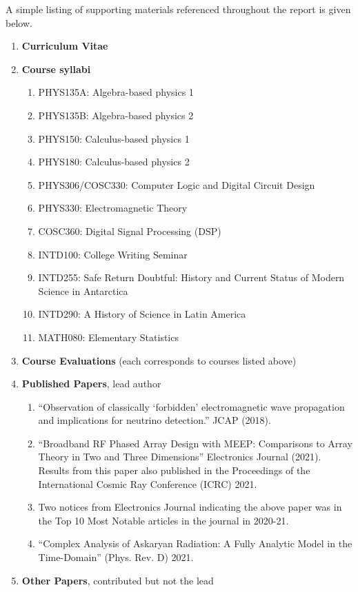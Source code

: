 \documentclass[../../main.tex]{subfiles}
\begin{document}
A simple listing of supporting materials referenced throughout the report is given below.
\begin{enumerate}
\item \textbf{Curriculum Vitae}
\item \textbf{Course syllabi}
\begin{enumerate}
\item PHYS135A: Algebra-based physics 1
\item PHYS135B: Algebra-based physics 2
\item PHYS150: Calculus-based physics 1
\item PHYS180: Calculus-based physics 2
\item PHYS306/COSC330: Computer Logic and Digital Circuit Design
\item PHYS330: Electromagnetic Theory
\item COSC360: Digital Signal Processing (DSP)
\item INTD100: College Writing Seminar
\item INTD255: Safe Return Doubtful: History and Current Status of Modern Science in Antarctica
\item INTD290: A History of Science in Latin America
\item MATH080: Elementary Statistics
\end{enumerate}
\item \textbf{Course Evaluations} (each corresponds to courses listed above)
\item \textbf{Published Papers}, lead author
\begin{enumerate}
\item ``Observation of classically `forbidden' electromagnetic wave propagation and implications for neutrino detection.'' JCAP (2018).
\item ``Broadband RF Phased Array Design with MEEP: Comparisons to Array Theory in Two and Three Dimensions'' Electronics Journal (2021).  Results from this paper also published in the Proceedings of the International Cosmic Ray Conference (ICRC) 2021.
\item Two notices from Electronics Journal indicating the above paper was in the Top 10 Most Notable articles in the journal in 2020-21.
\item ``Complex Analysis of Askaryan Radiation: A Fully Analytic Model in the Time-Domain'' (Phys. Rev. D) 2021.
\end{enumerate}
\item \textbf{Other Papers}, contributed but not the lead
\begin{enumerate}

\end{enumerate}
\end{enumerate}
\end{document}

